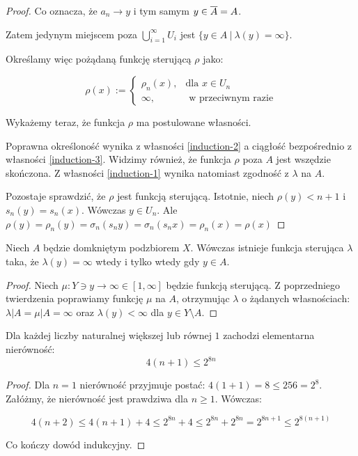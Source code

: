 \begin{thm}
\begin{proof}
  Co oznacza, że $a_n \rightarrow y$ i tym samym $y \in \overline{A} = A$.
  
  Zatem jedynym miejscem poza $\bigcup_{i=1}^\infty U_i$ jest $\{y \in A\ |\ \lambda(y) = \infty\}$.
  
  Określamy więc pożądaną funkcję sterującą $\rho$ jako:
  
  \[\rho(x) := 
    \begin{cases}
      \rho_n(x),&\mbox{dla } x \in U_n \\
      \infty,&\mbox{ w przeciwnym razie}
    \end{cases}
  \]
  
  Wykażemy teraz, że funkcja $\rho$ ma postulowane własności.
  
  Poprawna określoność wynika z własności \ref{induction-2} a ciągłość bezpośrednio z własności \ref{induction-3}. Widzimy również, że funkcja $\rho$ poza $A$ jest wszędzie skończona. Z własności \ref{induction-1} wynika natomiast zgodność z $\lambda$ na $A$.
  
  Pozostaje sprawdzić, że $\rho$ jest funkcją sterującą. Istotnie, niech $\rho(y) < n+1$ i $s_n(y) = s_n(x)$. Wówczas $y \in U_n$. Ale $\rho(y) = \rho_n(y) = \sigma_n(s_n y) = \sigma_n(s_n x) = \rho_n(x) = \rho(x)$
\end{proof}
\end{thm}


\begin{cor} \label{cor:steering-finite}
  Niech $A$ będzie domkniętym podzbiorem $X$. Wówczas istnieje funkcja sterująca $\lambda$ taka, że $\lambda(y) = \infty$ wtedy i tylko wtedy gdy $y \in A$.
  
  \begin{proof}
    Niech $\mu: Y \ni y \rightarrow \infty \in [1, \infty]$ będzie funkcją sterującą. Z poprzedniego twierdzenia poprawiamy funkcję $\mu$ na $A$, otrzymując $\lambda$ o żądanych własnościach: $\lambda|A = \mu|A = \infty$ oraz $\lambda(y) < \infty$ dla $y \in Y \setminus A$.
  \end{proof}
\end{cor}

\begin{lem}
  Dla każdej liczby naturalnej większej lub równej $1$ zachodzi elementarna nierówność:
  \[4(n+1) \leq 2^{8n}\]
  
  \begin{proof}
    Dla $n = 1$ nierówność przyjmuje postać: $4(1+1) = 8 \leq 256 = 2^8$.
    Załóżmy, że nierówność jest prawdziwa dla $n \geq 1$. Wówczas:
    
    \[4(n+2) \leq 4(n+1) + 4 \leq 2^{8n} + 4 \leq 2^{8n} + 2^{8n} = 2^{8n + 1} \leq 2^{8(n+1)}\]
    
    Co kończy dowód indukcyjny.
  \end{proof}
\end{lem}

